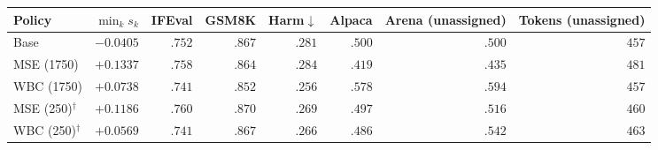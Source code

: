 \begin{tabular}{lrrrrrrr}
\toprule
Policy & $\min_k s_k$ & IFEval & GSM8K & Harm$\downarrow$ & Alpaca & Arena (unassigned) & Tokens (unassigned)\\
\midrule
Base & $-0.0405$ & $.752$ & $.867$ & $.281$ & $.500$ & $.500$ & $457$\\
MSE (1750) & $+0.1337$ & $.758$ & $.864$ & $.284$ & $.419$ & $.435$ & $481$\\
WBC (1750) & $+0.0738$ & $.741$ & $.852$ & $.256$ & $.578$ & $.594$ & $457$\\
MSE (250)$^\dagger$ & $+0.1186$ & $.760$ & $.870$ & $.269$ & $.497$ & $.516$ & $460$\\
WBC (250)$^\dagger$ & $+0.0569$ & $.741$ & $.867$ & $.266$ & $.486$ & $.542$ & $463$\\
\bottomrule
\end{tabular}
